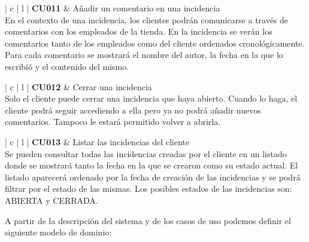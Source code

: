 \documentclass[11pt,spanish,listoffigures]{tfgetsinf}
\begin{document}
\begin{center}
\begin{tabular}{ | c | l | }
\hline
\textbf{ CU011 } & Añadir un comentario en una incidencia \\
\hline
{}
{
En el contexto de una incidencia, los clientes podrán comunicarse a través de comentarios con los empleados de la tienda. En la incidencia se verán los comentarios tanto de los empleados como del cliente ordenados cronológicamente. Para cada comentario se mostrará el nombre del autor, la fecha en la que lo escribió y el contenido del mismo.
} \\
\hline
\end{tabular}
\end{center}

\begin{center}
\begin{tabular}{ | c | l | }
\hline
\textbf{ CU012 } & Cerrar una incidencia \\
\hline
{}
{
Solo el cliente puede cerrar una incidencia que haya abierto. Cuando lo haga, el cliente podrá seguir accediendo a ella pero ya no podrá añadir nuevos comentarios. Tampoco le estará permitido volver a abrirla.
} \\
\hline
\end{tabular}
\end{center}

\begin{center}
\begin{tabular}{ | c | l | }
\hline
\textbf{ CU013 } & Listar las incidencias del cliente \\
\hline
{}
{
Se pueden consultar todas las incidencias creadas por el cliente en un listado donde se mostrará tanto la fecha en la que se crearon como su estado actual. El listado aparecerá ordenado por la fecha de creación de las incidencias y se podrá filtrar por el estado de las mismas. Los posibles estados de las incidencias son: ABIERTA y CERRADA.
} \\
\hline
\end{tabular}
\end{center}

A partir de la descripción del sistema y de los casos de uso podemos definir el siguiente modelo de dominio:
\end{document}
